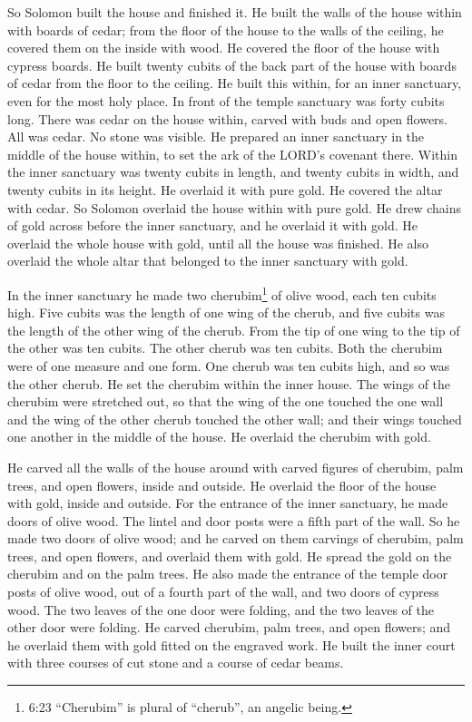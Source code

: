 \myverse{}So Solomon built the house and finished it.
\myverse{}He built the walls of the house within with boards of cedar; from the floor
of the house to the walls of the ceiling, he covered them on the inside with wood. He covered the floor
of the house with cypress boards.
\myverse{}He built twenty cubits of the back part of the house with boards of cedar
from the floor to the ceiling. He built this within, for an inner sanctuary, even for the most holy place.
\myverse{}In front of the temple sanctuary was forty cubits long.
\myverse{}There was cedar on the house within, carved with buds and open flowers. All
was cedar. No stone was visible.
\myverse{}He prepared an inner sanctuary in the middle of the house within, to set the
ark of the LORD’s covenant there.
\myverse{}Within the inner sanctuary was twenty cubits in length, and twenty cubits
in width, and twenty cubits in its height. He overlaid it with pure gold. He covered the altar with cedar.
\myverse{}So Solomon overlaid the house within with pure gold. He drew chains of gold
across before the inner sanctuary, and he overlaid it with gold.
\myverse{}He overlaid the whole house with gold, until all the house was finished. He
also overlaid the whole altar that belonged to the inner sanctuary with gold.

\myverse{}In the inner sanctuary he made two cherubim\footnote{6:23 “Cherubim” is plural of “cherub”, an angelic being.} of olive wood, each ten cubits high.
\myverse{}Five cubits was the length of one wing of the cherub, and five cubits was
the length of the other wing of the cherub. From the tip of one wing to the tip of the other was ten cubits.
\myverse{}The other cherub was ten cubits. Both the cherubim were of one measure and
one form.
\myverse{}One cherub was ten cubits high, and so was the other cherub.
\myverse{}He set the cherubim within the inner house. The wings of the cherubim were
stretched out, so that the wing of the one touched the one wall and the wing of the other cherub touched
the other wall; and their wings touched one another in the middle of the house.
\myverse{}He overlaid the cherubim with gold.

\myverse{}He carved all the walls of the house around with carved figures
of cherubim, palm trees, and open flowers, inside and outside.
\myverse{}He overlaid the floor of the house with gold, inside and outside.
\myverse{}For the entrance of the inner sanctuary, he made doors of olive wood. The
lintel and door posts were a fifth part of the wall.
\myverse{}So he made two doors of olive wood; and he carved on them carvings of cherubim,
palm trees, and open flowers, and overlaid them with gold. He spread the gold on the cherubim and on the
palm trees.
\myverse{}He also made the entrance of the temple door posts of olive wood, out of a
fourth part of the wall,
\myverse{}and two doors of cypress wood. The two leaves of the one door were folding,
and the two leaves of the other door were folding.
\myverse{}He carved cherubim, palm trees, and open flowers; and he overlaid them with
gold fitted on the engraved work.
\myverse{}He built the inner court with three courses of cut stone and a course of cedar
beams.

